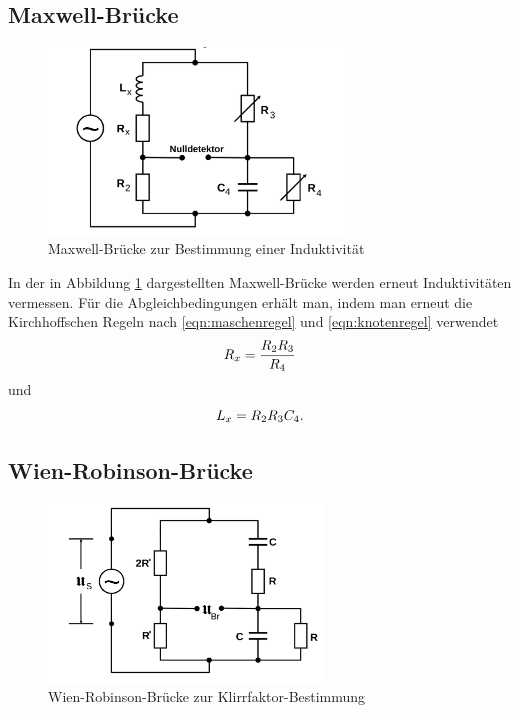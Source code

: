 \subsection{Maxwell-Brücke}
\begin{figure}
  \centering
  \includegraphics[width=0.7\textwidth]{Bilder/maxwell_bruecke.png}
  \caption{Maxwell-Brücke zur Bestimmung einer Induktivität \cite{Anleitung}}
  \label{fig:maxwellbrücke}
\end{figure}
In der in Abbildung \ref{fig:maxwellbrücke} dargestellten Maxwell-Brücke werden erneut Induktivitäten vermessen.
Für die Abgleichbedingungen erhält man, indem man erneut die Kirchhoffschen Regeln nach \eqref{eqn:maschenregel} und \eqref{eqn:knotenregel} verwendet
\begin{equation}
\label{eqn:maxwellr}
\centering
R_x=\frac{R_2R_3}{R_4}
\end{equation}
und
\begin{equation}
\centering
\label{eqn:maxwellinduktivität}
L_x=R_2R_3C_4 \text{.}
\end{equation}
\subsection{Wien-Robinson-Brücke}
\begin{figure}
  \centering
  \includegraphics[width=0.65\textwidth]{Bilder/wien_robinson_bruecke.png}
  \caption{Wien-Robinson-Brücke zur Klirrfaktor-Bestimmung \cite{Anleitung}}
  \label{fig:wienrobinsonbrücke}
\end{figure}

